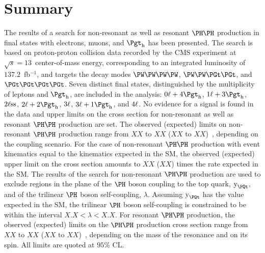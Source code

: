 \section{Summary}
\label{sec:summary}

The results of a search for non-resonant as well as resonant $\HH$ production in final states with electrons, muons, and $\tauh$ has been presented.
The search is based on proton-proton collision data recorded by the CMS experiment at $\sqrt{s} = 13$~\TeV center-of-mass energy,
corresponding to an integrated luminosity of $137.2$~fb$^{-1}$,
and targets the decay modes $\PW\PW\PW\PW$, $\PW\PW\PGt\PGt$, and $\PGt\PGt\PGt\PGt$.
Seven distinct final states, distinguished by the multiplicity of leptons and $\tauh$, are included in the analysis:
$0\Plepton + 4\tauh$, $1\Plepton + 3\tauh$, $2\ell\text{ss}$, $2\Plepton + 2\tauh$, $3\ell$, $3\Plepton + 1\tauh$, and $4\ell$.
No evidence for a signal is found in the data and upper limits on the cross section for non-resonant as well as resonant $\HH$ production are set.
The observed (expected) limits on non-resonant $\HH$ production range from $XX$ to $XX$ ($XX$ to $XX$)~\pb, depending on the coupling scenario.
For the case of non-resonant $\HH$ production with event kinematics equal to the kinematics expected in the SM,
the observed (expected) upper limit on the cross section amounts to $XX$ ($XX$) times the rate expected in the SM.
The results of the search for non-resonant $\HH$ production are used to exclude regions in the plane of the $\PHiggs$ boson coupling to the top quark, $\yt$,
and of the trilinear $\PHiggs$ boson self-coupling, $\lambda$.
Assuming $\yt$ has the value expected in the SM, the trilinear $\PHiggs$ boson self-coupling is constrained to be within the interval $X.X < \lambda < X.X$.
For resonant $\HH$ production, the observed (expected) limits on the $\HH$ production cross section range from $XX$ to $XX$ ($XX$ to $XX$)~\pb, 
depending on the mass of the resonance and on its spin.
All limits are quoted at $95\%$ CL.
